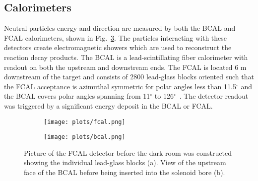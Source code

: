 \subsection{Calorimeters}
\label{p.2.2.3}

Neutral particles energy and direction are measured by both the BCAL and FCAL calorimeters, shown in Fig.~\ref{fig.2.2.3}. The particles interacting with these detectors create electromagnetic showers which are used to reconstruct the reaction decay products. The BCAL is a lead-scintillating fiber calorimeter with readout on both the upstream and downstream ends. The FCAL is located 6 m downstream of the target and consists of 2800 lead-glass blocks oriented such that the FCAL acceptance is azimuthal symmetric for polar angles less than 11.5$^{\circ}$ and the BCAL covers polar angles spanning from 11$^{\circ}$ to 126$^{\circ}$~\cite{31}. The detector readout was triggered by a significant energy deposit in the BCAL or FCAL.


\begin{figure}[H]
    \centering
    \begin{subfigure}[b]{0.4\textwidth}
        \texttt{[image: plots/fcal.png]}
        \caption{}
        \label{fig.2.2.3.a}
    \end{subfigure}\hfill
    \begin{subfigure}[b]{0.54\textwidth}
        \texttt{[image: plots/bcal.png]}
        \caption{}
        \label{fig.2.2.3.b}
    \end{subfigure}
    \caption{Picture of the FCAL detector before the dark room was constructed showing the individual lead-glass blocks (a). View of the upstream face of the BCAL before being inserted into the solenoid bore (b).}
    \label{fig.2.2.3}
\end{figure}


